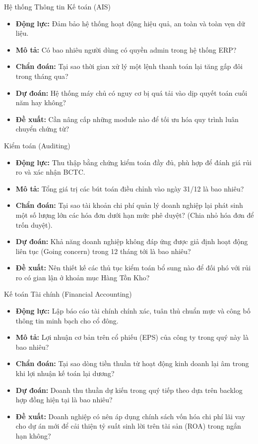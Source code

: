 \documentclass[aspectratio=169,12pt]{beamer}
\begin{document}
\begin{frame}{Hệ thống Thông tin Kế toán (AIS)}
\begin{itemize}
    \item \textbf{Động lực:} Đảm bảo hệ thống hoạt động hiệu quả, an toàn và toàn vẹn dữ liệu.
    \item \textbf{Mô tả:} Có bao nhiêu người dùng có quyền admin trong hệ thống ERP?
    \item \textbf{Chẩn đoán:} Tại sao thời gian xử lý một lệnh thanh toán lại tăng gấp đôi trong tháng qua?
    \item \textbf{Dự đoán:} Hệ thống máy chủ có nguy cơ bị quá tải vào dịp quyết toán cuối năm hay không?
    \item \textbf{Đề xuất:} Cần nâng cấp những module nào để tối ưu hóa quy trình luân chuyển chứng từ?
\end{itemize}
\end{frame}

\begin{frame}{Kiểm toán (Auditing)}
\begin{itemize}
    \item \textbf{Động lực:} Thu thập bằng chứng kiểm toán đầy đủ, phù hợp để đánh giá rủi ro và xác nhận BCTC.
    \item \textbf{Mô tả:} Tổng giá trị các bút toán điều chỉnh vào ngày 31/12 là bao nhiêu?
    \item \textbf{Chẩn đoán:} Tại sao tài khoản chi phí quản lý doanh nghiệp lại phát sinh một số lượng lớn các hóa đơn dưới hạn mức phê duyệt? (Chia nhỏ hóa đơn để trốn duyệt).
    \item \textbf{Dự đoán:} Khả năng doanh nghiệp không đáp ứng được giả định hoạt động liên tục (Going concern) trong 12 tháng tới là bao nhiêu?
    \item \textbf{Đề xuất:} Nên thiết kế các thủ tục kiểm toán bổ sung nào để đối phó với rủi ro có gian lận ở khoản mục Hàng Tồn Kho?
\end{itemize}
\end{frame}

\begin{frame}{Kế toán Tài chính (Financial Accounting)}
\begin{itemize}
    \item \textbf{Động lực:} Lập báo cáo tài chính chính xác, tuân thủ chuẩn mực và công bố thông tin minh bạch cho cổ đông.
    \item \textbf{Mô tả:} Lợi nhuận cơ bản trên cổ phiếu (EPS) của công ty trong quý này là bao nhiêu?
    \item \textbf{Chẩn đoán:} Tại sao dòng tiền thuần từ hoạt động kinh doanh lại âm trong khi lợi nhuận kế toán lại dương?
    \item \textbf{Dự đoán:} Doanh thu thuần dự kiến trong quý tiếp theo dựa trên backlog hợp đồng hiện tại là bao nhiêu?
    \item \textbf{Đề xuất:} Doanh nghiệp có nên áp dụng chính sách vốn hóa chi phí lãi vay cho dự án mới để cải thiện tỷ suất sinh lời trên tài sản (ROA) trong ngắn hạn không?
\end{itemize}
\end{frame}
\end{document}
